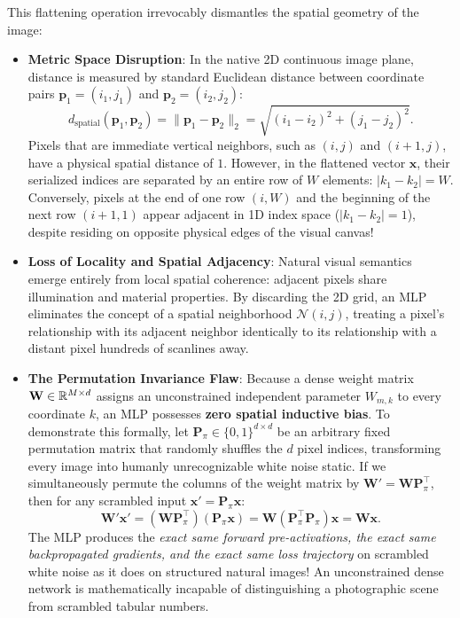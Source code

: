 This flattening operation irrevocably dismantles the spatial geometry of the image:
\begin{itemize}[leftmargin=*]
  \item \textbf{Metric Space Disruption}: In the native 2D continuous image plane, distance is measured by standard Euclidean distance between coordinate pairs $\mathbf{p}_1 = (i_1, j_1)$ and $\mathbf{p}_2 = (i_2, j_2)$:
    \begin{equation}
    d_{\text{spatial}}(\mathbf{p}_1, \mathbf{p}_2) = \|\mathbf{p}_1 - \mathbf{p}_2\|_2 = \sqrt{(i_1 - i_2)^2 + (j_1 - j_2)^2}.
    \end{equation}
    Pixels that are immediate vertical neighbors, such as $(i, j)$ and $(i+1, j)$, have a physical spatial distance of $1$. However, in the flattened vector $\mathbf{x}$, their serialized indices are separated by an entire row of $W$ elements: $|k_1 - k_2| = W$. Conversely, pixels at the end of one row $(i, W)$ and the beginning of the next row $(i+1, 1)$ appear adjacent in 1D index space ($|k_1 - k_2| = 1$), despite residing on opposite physical edges of the visual canvas!
  \item \textbf{Loss of Locality and Spatial Adjacency}: Natural visual semantics emerge entirely from local spatial coherence: adjacent pixels share illumination and material properties. By discarding the 2D grid, an MLP eliminates the concept of a spatial neighborhood $\mathcal{N}(i, j)$, treating a pixel's relationship with its adjacent neighbor identically to its relationship with a distant pixel hundreds of scanlines away.
  \item \textbf{The Permutation Invariance Flaw}: Because a dense weight matrix $\mathbf{W} \in \mathbb{R}^{M \times d}$ assigns an unconstrained independent parameter $W_{m, k}$ to every coordinate $k$, an MLP possesses \textbf{zero spatial inductive bias}. To demonstrate this formally, let $\mathbf{P}_\pi \in \{0, 1\}^{d \times d}$ be an arbitrary fixed permutation matrix that randomly shuffles the $d$ pixel indices, transforming every image into humanly unrecognizable white noise static. If we simultaneously permute the columns of the weight matrix by $\mathbf{W}' = \mathbf{W}\mathbf{P}_\pi^\top$, then for any scrambled input $\mathbf{x}' = \mathbf{P}_\pi \mathbf{x}$:
    \begin{equation}
    \mathbf{W}' \mathbf{x}' = (\mathbf{W}\mathbf{P}_\pi^\top)(\mathbf{P}_\pi \mathbf{x}) = \mathbf{W}(\mathbf{P}_\pi^\top \mathbf{P}_\pi)\mathbf{x} = \mathbf{W}\mathbf{x}.
    \end{equation}
    The MLP produces the \textit{exact same forward pre-activations, the exact same backpropagated gradients, and the exact same loss trajectory} on scrambled white noise as it does on structured natural images! An unconstrained dense network is mathematically incapable of distinguishing a photographic scene from scrambled tabular numbers.
\end{itemize}

